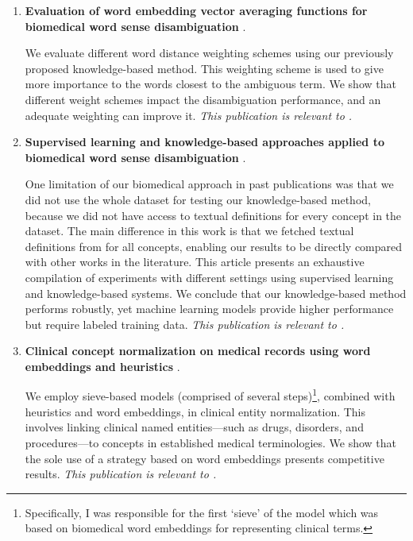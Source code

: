 \begin{enumerate}[topsep=12pt,itemsep=12pt]
\item
\textbf{Evaluation of word embedding vector averaging functions for biomedical word sense disambiguation} \parencite{antunes2017b}.\par
We evaluate different word distance weighting schemes using our previously proposed knowledge-based method.
This weighting scheme is used to give more importance to the words closest to the ambiguous term.
We show that different weight schemes impact the disambiguation performance, and an adequate weighting can improve it.
\newline\textit{This publication is relevant to .}

\item
\textbf{Supervised learning and knowledge-based approaches applied to biomedical word sense disambiguation} \parencite{antunes2017c}.\par
One limitation of our biomedical  approach in past publications \parencite{antunes2017a,antunes2017b} was that we did not use the whole dataset for testing our knowledge-based method, because we did not have access to textual definitions for every concept in the dataset.
The main difference in this work is that we fetched textual definitions from  for all concepts, enabling our results to be directly compared with other works in the literature.
This article presents an exhaustive compilation of experiments with different settings using supervised learning and knowledge-based systems.
We conclude that our knowledge-based method performs robustly, yet machine learning models provide higher performance but require labeled training data.
\newline\textit{This publication is relevant to .}

\item
\textbf{Clinical concept normalization on medical records using word embeddings and heuristics} \parencite{silva2020a}.\par
We employ sieve-based models (comprised of several steps)\footnote{Specifically, I was responsible for the first `sieve' of the model which was based on biomedical word embeddings for representing clinical terms.}, combined with heuristics and word embeddings, in clinical entity normalization.
This involves linking clinical named entities---such as drugs, disorders, and procedures---to concepts in established medical terminologies.
We show that the sole use of a strategy based on word embeddings presents competitive results.
\newline\textit{This publication is relevant to .}


\end{enumerate}
